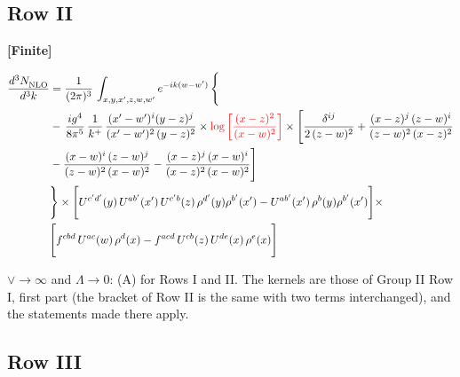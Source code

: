 \documentclass[9pt]{article}
\numberwithin{equation}{section}
\begin{document}
\subsection{Row II}
\par\smallskip\noindent\textbf{[Finite]}\par\nobreak
\begin{align}
     \frac{d^{3}N_{\rm NLO}^{\rm}}{d^{3}k}  & =   \frac{1}{(2\pi)^{3}}\, \int_{x,y,x',z,w,w^{\prime}} e^{-ik(w-w^{\prime})}\, \Bigg\{\notag \\
& -\,\frac{ig^{4}}{8\pi^{5}}\,\frac{1}{k^{+}}\,\frac{(x'-w')^{i}(y-z)^{j}}{(x'-w')^{2}\,(y-z)^{2}}\times {\color{red}\log{\left[\frac{(x-z)^{2}}{(x-w)^{2}}\right]}}\times \Bigg[\frac{\delta^{ij}}{2\,(z-w)^{2}}+\frac{(x-z)^{j}\,(z-w)^{i}}{(z-w)^{2}\,(x-z)^{2}}\notag \\ & -\frac{(x-w)^{i}\,(z-w)^{j}}{(z-w)^{2}\,(x-w)^{2}}-\frac{(x-z)^{j}\,(x-w)^{i}}{(x-z)^{2}\,(x-w)^{2}}\Bigg] \notag \\
& \Bigg\}\times \Bigg[U^{c'd'}(y)\,U^{ab'}(x')\,U^{c'b}(z)\,\rho^{d'}(y)\rho^{b'}(x')-U^{ab'}(x')\,\rho^{b}(y)\rho^{b'}(x')\Bigg]\times\notag \\ & \Bigg[f^{cbd}\,U^{ac}(w)\,\rho^{d}(x)-f^{acd}\, U^{cb}(z)\,U^{de}(x)\,\rho^{e}(x)\Bigg]
\end{align}
\par{}\par\medskip
\noindent $\vee\to\infty$ and $\Lambda\to0$: (A) for Rows I and II. The kernels are those of Group II Row I, first part (the bracket of Row II is the same with two terms interchanged), and the statements made there apply.
\subsection{Row III}
\end{document}
